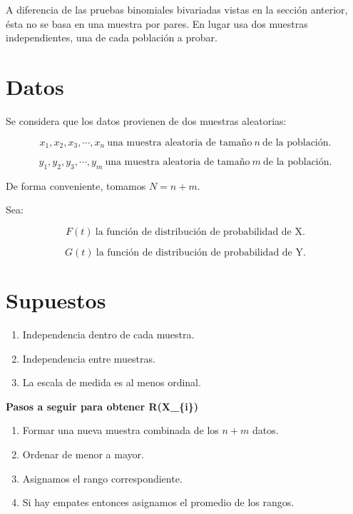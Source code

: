 \documentclass[
  a4paper,
  oneside,
  openany]{book}
\begin{document}
A diferencia de las pruebas binomiales bivariadas vistas en la sección anterior, ésta no se basa en una muestra por pares. En lugar usa dos muestras independientes, una de cada población a probar.

\hypertarget{datos-5}{%
\section{Datos}\label{datos-5}}

Se considera que los datos provienen de dos muestras aleatorias:

\[x_{1},x_{2},x_{3},\cdots,x_{n} \ \mbox{una muestra aleatoria de tamaño} \ n \ \mbox{de la población.}\]

\[y_{1},y_{2},y_{3},\cdots,y_{m} \ \mbox{una muestra aleatoria de tamaño} \  m \  \mbox{de la población.}\]

De forma conveniente, tomamos \(N=n+m\).

Sea:

\[F(t) \ \mbox{la función de distribución de probabilidad de X.}\]

\[G(t) \ \mbox{la función de distribución de probabilidad de Y.}\]

\hypertarget{supuestos-5}{%
\section{Supuestos}\label{supuestos-5}}

\begin{enumerate}
\def\labelenumi{\arabic{enumi})}
\item
  Independencia dentro de cada muestra.
\item
  Independencia entre muestras.
\item
  La escala de medida es al menos ordinal.
\end{enumerate}

\textbf{Pasos a seguir para obtener R(X\_\{i\})}

\begin{enumerate}
\def\labelenumi{\arabic{enumi}.}
\item
  Formar una nueva muestra combinada de los \(n+m\) datos.
\item
  Ordenar de menor a mayor.
\item
  Asignamos el rango correspondiente.
\item
  Si hay empates entonces asignamos el promedio de los rangos.
\end{enumerate}
\end{document}
